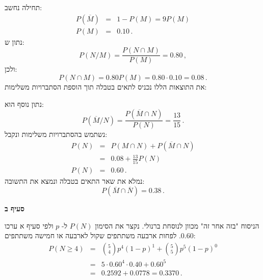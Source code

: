 תחילה נחשב:
\begin{eqnarray*}
P(\overline{M})&=&1-P(M)=9P(M)\\
P(M)&=&0.10\,.
\end{eqnarray*}
נתון ש:
\[
P(N/M)=\frac{P(N\cap M)}{P(M)}=0.80\,,
\]
ולכן:
\[
P(N\cap M) = 0.80P(M)=0.80\cdot 0.10=0.08\,.
\]
את התוצאות הללו נכניס לתאים בטבלה תוך הוספת הסתברויות משלימות:
\begin{center}
\end{center}
נתון נוסף הוא:
\[
P(\overline{M}/N)=\frac{P(\overline{M}\cap N)}{P(N)}=\frac{13}{15}\,.
\]
נשתמש בהסתברויות משלימות ונקבל:
\begin{eqnarray*}
P(N)&=&P(M\cap N)+P(\overline{M}\cap N)\\[6pt]
&=&0.08+\frac{13}{15}P(N)\\
P(N)&=&0.60\,.
\end{eqnarray*}
נמלא את שאר התאים בטבלה ונמצא את התשובה:
\[
P(\overline{M}\cap \overline{N})=0.38\,.
\]
\begin{center}
\end{center}

\textbf{סעיף ב}

הניסוח "בזה אחר זה" מכוון לנוסחת ברנולי. נקצר את הסימון 
$P(N)$
ל-%
$p$
ולפי סעיף א ערכו 
$0.60$.
לפחות ארבעה משתתפים שקול לארבעה או חמישה משתתפים:
\begin{eqnarray*}
P(N\geq 4) &=& {5 \choose 4}p^4(1-p)^1+{5 \choose 5}p^5(1-p)^0\\
&=& 5\cdot 0.60^4\cdot 0.40 + 0.60^5\\
&=& 0.2592+0.0778=0.3370\,.
\end{eqnarray*}

